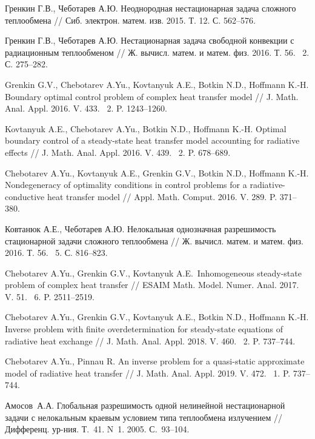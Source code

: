 \documentclass[12pt]{article}
\begin{document}
\begin{thebibliography}{999}
        Гренкин Г.В., Чеботарев А.Ю. Неоднородная нестационарная задача сложного теплообмена
        // Сиб. электрон. матем. изв. 2015. Т. 12. С. 562--576.

        Гренкин Г.В., Чеботарев А.Ю. Нестационарная задача свободной конвекции с радиационным теплообменом // Ж.
        вычисл. матем. и матем. физ. 2016. Т. 56. \textnumero~2. С. 275--282.

        Grenkin G.V., Chebotarev A.Yu., Kovtanyuk A.E., Botkin N.D., Hoffmann K.-H\@.
        Boundary optimal control problem of complex heat transfer model // J. Math.
        Anal. Appl. 2016. V. 433. \textnumero~2. P. 1243--1260.

        Kovtanyuk A.E., Chebotarev A.Yu., Botkin N.D., Hoffmann K.-H\@.
        Optimal boundary control of a steady-state heat transfer model accounting for radiative effects // J. Math.
        Anal. Appl. 2016. V. 439. \textnumero~2. P. 678--689.

        Chebotarev A.Yu., Kovtanyuk A.E., Grenkin G.V., Botkin N.D., Hoffmann K.-H\@.
        Nondegeneracy of optimality conditions in control problems for a radiative-conductive heat transfer model
        // Appl. Math. Comput. 2016. V. 289. P. 371--380.

        Ковтанюк А.Е., Чеботарев А.Ю. Нелокальная однозначная разрешимость стационарной задачи сложного теплообмена
        // Ж. вычисл. матем. и матем. физ. 2016. Т. 56. \textnumero~5. С. 816--823.

        Chebotarev A.Yu., Grenkin G.V., Kovtanyuk A.E.\ Inhomogeneous steady-state problem of complex heat transfer
        // ESAIM Math. Model. Numer. Anal. 2017. V. 51. \textnumero~6. P. 2511--2519.

        Chebotarev A.Yu., Grenkin G.V., Kovtanyuk A.E., Botkin N.D., Hoffmann K.-H\@.
        Inverse problem with finite overdetermination for steady-state equations of radiative heat exchange
        // J. Math. Anal. Appl. 2018. V. 460. \textnumero~2. P. 737--744.

        Chebotarev A.Yu., Pinnau R. An inverse problem for a quasi-static approximate model of radiative heat transfer
        // J. Math. Anal. Appl. 2019. V. 472. \textnumero~1. P. 737--744.


        Амосов~А.А. Глобальная разрешимость одной нелинейной нестационарной задачи с
        нелокальным краевым условием типа теплообмена излучением // Дифференц.
        ур-ния. Т.~41. N~1. 2005. С.~93--104.


\end{thebibliography}
\end{document}
